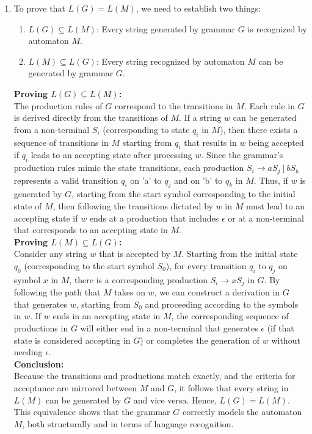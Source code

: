 \documentclass[a4paper]{article}
\begin{document}
\begin{enumerate}[label=(\alph*)]
        \item To prove that $L(G) = L(M)$, we need to establish two things: \\
        \begin{enumerate}
            \item $L(G) \subseteq L(M)$: Every string generated by grammar $G$ is recognized by automaton $M$.
            \item $L(M) \subseteq L(G)$: Every string recognized by automaton $M$ can be generated by grammar $G$. \\
        \end{enumerate}

        \textbf{Proving $L(G) \subseteq L(M)$:} \\
        The production rules of $G$ correspond to the transitions in $M$. Each rule in $G$ is derived directly from the transitions of $M$. If a string $w$ can be generated from a non-terminal $S_i$ (corresponding to state $q_i$ in $M$), then there exists a sequence of transitions in $M$ starting from $q_i$ that results in $w$ being accepted if $q_i$ leads to an accepting state after processing $w$. Since the grammar's production rules mimic the state transitions, each production $S_i \rightarrow aS_j \ | \ bS_k$ represents a valid transition $q_i$ on 'a' to $q_j$ and on 'b' to $q_k$ in $M$. Thus, if $w$ is generated by $G$, starting from the start symbol corresponding to the initial state of $M$, then following the transitions dictated by $w$ in $M$ must lead to an accepting state if $w$ ends at a production that includes $\epsilon$ or at a non-terminal that corresponds to an accepting state in $M$. \\

        \textbf{Proving $L(M) \subseteq L(G)$:} \\
        Consider any string $w$ that is accepted by $M$. Starting from the initial state $q_0$ (corresponding to the start symbol $S_0$), for every transition $q_i$ to $q_j$ on symbol $x$ in $M$, there is a corresponding production $S_i \rightarrow xS_j$ in $G$. By following the path that $M$ takes on $w$, we can construct a derivation in $G$ that generates $w$, starting from $S_0$ and proceeding according to the symbols in $w$. If $w$ ends in an accepting state in $M$, the corresponding sequence of productions in $G$ will either end in a non-terminal that generates $\epsilon$ (if that state is considered accepting in $G$) or completes the generation of $w$ without needing $\epsilon$. \\

        \textbf{Conclusion:} \\
        Because the transitions and productions match exactly, and the criteria for acceptance are mirrored between $M$ and $G$, it follows that every string in $L(M)$ can be generated by $G$ and vice versa. Hence, $L(G) = L(M)$. This equivalence shows that the grammar $G$ correctly models the automaton $M$, both structurally and in terms of language recognition. \\
    \end{enumerate}
\end{document}
